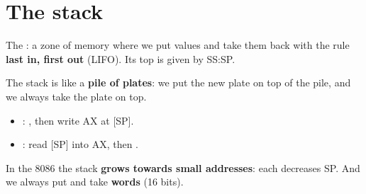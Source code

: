 \section{The stack}

\begin{tarif}
    The : a zone of memory where we put values and take them back with the rule
    \textbf{last in, first out} (LIFO). Its top is given by SS:SP.
\end{tarif}

\begin{tashbih}
    The stack is like a \textbf{pile of plates}: we put the new plate on top of the pile, and we always take the plate on top.
\end{tashbih}

\begin{itemize}
    \item {}: , then write AX at [SP].
    \item {}: read [SP] into AX, then .
\end{itemize}

\begin{intabih}
    In the 8086 the stack \textbf{grows towards small addresses}: each  decreases SP. And we always
    put and take \textbf{words} (16 bits).
\end{intabih}


\begin{center}
\end{center}

